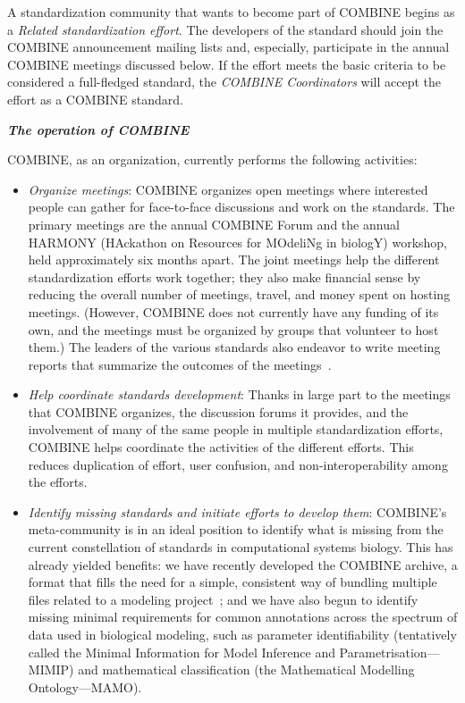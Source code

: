 A standardization community that wants to become part of COMBINE begins as a \emph{Related standardization effort}.  The developers of the standard should join the COMBINE announcement mailing lists and, especially, participate in the annual COMBINE meetings discussed below.  If the effort meets the basic criteria to be considered a full-fledged standard, the \emph{COMBINE Coordinators} will accept the effort as a COMBINE standard.


\textbf{\textsl{The operation of COMBINE}}

COMBINE, as an organization, currently performs the following activities:
\vspace*{-1em}
\begin{itemize}

\item \emph{Organize meetings}: COMBINE organizes open meetings where interested people can gather for face-to-face discussions and work on the standards.  The primary meetings are the annual COMBINE Forum and the annual HARMONY (HAckathon on Resources for MOdeliNg in biologY) workshop, held approximately six months apart.  The joint meetings help the different standardization efforts work together; they also make financial sense by reducing the overall number of meetings, travel, and money spent on hosting meetings.  (However, COMBINE does not currently have any funding of its own, and the meetings must be organized by groups that volunteer to host them.)  The leaders of the various standards also endeavor to write meeting reports that summarize the outcomes of the meetings~\citep[e.g.,][]{le2011meeting, waltemath2014meeting}.

\item \emph{Help coordinate standards development}: Thanks in large part to the meetings that COMBINE organizes, the discussion forums it provides, and the involvement of many of the same people in multiple standardization efforts, COMBINE helps coordinate the activities of the different efforts.  This reduces duplication of effort, user confusion, and non-interoperability among the efforts.

\item \emph{Identify missing standards and initiate efforts to develop them}: COMBINE's meta-community is in an ideal position to identify what is missing from the current constellation of standards in computational systems biology.  This has already yielded benefits: we have recently developed the COMBINE archive, a format that fills the need for a simple, consistent way of bundling multiple files related to a modeling project~\cite[\url{http://co.mbine.org/standards/omex};][]{Bergmann2014combine}; and we have also begun to identify missing minimal requirements for common annotations across the spectrum of data used in biological modeling, such as parameter identifiability (tentatively called the Minimal Information for Model Inference and Parametrisation---MIMIP) and mathematical classification (the Mathematical Modelling Ontology---MAMO).


\end{itemize}
